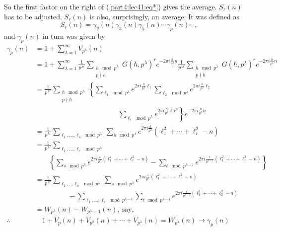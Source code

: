 So the first factor on the right of (\ref{part4:lec41:eq*}) gives the average. $S_r(n)$
has to be adjusted. $S_r (n)$ is also, surprisingly, an average. It
was defined as 
$$
S_r (n) = \gamma_2 (n) \gamma_3 (n) \gamma_5 (n) \cdots \gamma_p (n)
\cdots, 
$$
and $\gamma_p (n)$ in turn was given by\pageoriginale
\begin{align*}
  \gamma_p (n) & = 1+ \sum^\infty_{\lambda=1} V_{p^\lambda} (n)\\
  & = 1+ \sum^\infty_{\lambda=1} \frac{1}{p^{\lambda r}}
  \sum_{\substack{h \mod p^\lambda\\p \nmid h}} G(h, p^\lambda)^{r}
  e^{- 2 \pi i \frac{h}{p^\lambda}n} \frac{1}{p^{\lambda r}}
    \sum_{\substack{h \mod p^\lambda\\p \nmid h}} G(h, p^\lambda)^r
    e^{-2 \pi i \frac{h}{p^\lambda}n}\\
    & = \frac{1}{p^{\lambda r}} \sum_{\substack{h \mod p^\lambda\\p
        \nmid h}} \left\{ \sum_{\ell_1 \mod p^\lambda} e^{2 \pi i
      \frac{h}{p^\lambda}\ell_1} \sum_{\ell_2 \mod p^\lambda} e^{2 \pi
        i \frac{h}{p^\lambda} \ell_2}\right.\\
    & \hspace{5cm}\left.\sum_{\ell_r \mod p^\lambda}
      e^{2 \pi i \frac{h}{p^\lambda} \ell r^2} \right\} e^{- 2\pi i
            \frac{h}{p^\lambda}n}\\
    & =\frac{1}{p^{\lambda r}} \sum_{\ell_1 , \ldots , \ell_4 \mod
        p^\lambda}~ \sum_{h \mod p^\lambda} e^{2 \pi i
        \frac{h}{p^\lambda}}(\ell_1^2 + \cdots + \ell_r^2 -n)\\
    & = \frac{1}{p^{\lambda r}} \sum_{\ell_1, \ldots , \ell_r \mod
        p^\lambda}\\
    & \qquad \left\{ \sum_{s \mod p^\lambda} e^{2 \pi i \frac{s}{p^\lambda}
          (\ell_1^2 + \cdots + \ell_r^2 -n)}- \sum_{t \mod p^{\lambda
            -1}} e^{2 \pi i \frac{t}{p^{\lambda -1}} (\ell_1^2 +
          \cdots + \ell_r^2 -n)}\right\}\\
    & = \frac{1}{p^{\lambda r}} \sum_{\ell_1, \ldots \ell_n \mod
        p^\lambda} ~\sum_{s \mod p^\lambda} e^{2 \pi i
        \frac{s}{p^\lambda} (\ell_1^2 + \cdots + \ell_r^2 -n)}\\
    & \hspace{2cm} - \sum_{\ell_1, \ldots , \ell_r \mod p^{\lambda -1}}
      \sum_{t \mod p^{\lambda -1}} e^{2 \pi i \frac{t}{p^{\lambda -1}}
        (\ell_1^2 + \cdots + \ell_2^2 -n)}\\
    & = W_{p^\lambda} (n) - W_{p^\lambda-1} (n), ~\text{say},\\
    \therefore \quad & \quad 1+ V_p (n)+ V_{p^2}(n) + \cdots + V_{p^\lambda} (n) =
    W_{p^\lambda} (n) \to \gamma_p (n)       
\end{align*}

